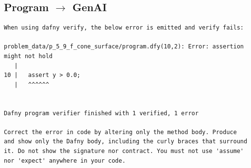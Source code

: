 \documentclass{article}
\begin{document}
\subsection*{Program $\rightarrow$ GenAI}
\begin{lstlisting}
When using dafny verify, the below error is emitted and verify fails:

problem_data/p_5_9_f_cone_surface/program.dfy(10,2): Error: assertion might not hold
   |
10 |   assert y > 0.0;
   |   ^^^^^^


Dafny program verifier finished with 1 verified, 1 error

Correct the error in code by altering only the method body. Produce and show only the Dafny body, including the curly braces that surround it. Do not show the signature nor contract. You must not use 'assume' nor 'expect' anywhere in your code.
\end{lstlisting}
\end{document}
